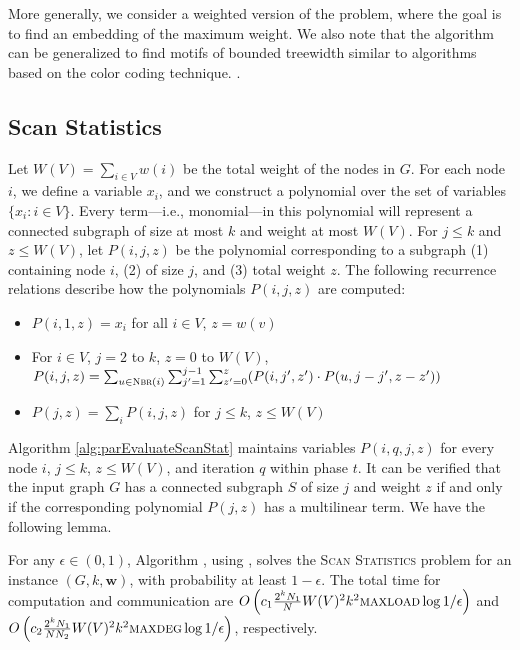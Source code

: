 More generally, we consider a weighted version of the problem, where the goal is to find an embedding of the maximum weight. We also note that the algorithm can be generalized to find motifs of bounded treewidth similar to algorithms based on the color coding technique. \cite{alon1995color}.
\fi 

\subsection{Scan Statistics}
\label{sec:apps-scanstat}
Let $W(V) = \sum_{i\in V}{w(i)}$ be the total weight of the nodes in $G$. For each node $i$, we define a variable $x_i$, and we construct a polynomial over the set of variables $\{x_i: i \in V\}$. Every term---i.e., monomial---in this polynomial will represent a connected subgraph of size at most $k$ and weight at most $W(V)$.
For $j \leq k$ and $z \leq W(V)$, let $P(i,j,z)$ be the polynomial corresponding to a subgraph (1) containing node $i$, (2) of size $j$, and (3) total weight $z$. The following recurrence relations describe how the polynomials $P(i, j, z)$ are computed:
\begin{itemize}
\item
$P(i, 1, z) = x_i$ for all $i \in V$, $z = w(v)$
\item
For $i \in V$, $j = 2$ to $k$, $z = 0$ to $W(V)$, 
$P(i,j, z) = \sum_{u \in \textsc{Nbr}(i)} \sum_{j' = 1}^{j-1}\sum_{z'=0}^z (P(i, j', z') \cdot P(u, j - j', z-z'))$
\item
$P(j, z) = \sum_i P(i,j, z)$ for $j \leq k$, $z \leq W(V)$
\end{itemize}
Algorithm \ref{alg:parEvaluateScanStat} maintains variables $P(i, q, j, z)$ for every node $i$, $j\leq k$, $z \leq W(V)$, and iteration $q$ within phase $t$. It can be verified \cite{cadena:bigdata17} that the input graph $G$ has a connected subgraph $S$ of size $j$ and weight $z$ if and only if the corresponding polynomial $P(j, z)$ has a multilinear term.
We have the following lemma.

\begin{lemma}
\label{lemma:parmaxwt-scan}
For any $\epsilon\in(0, 1)$,
Algorithm \ouralgo{}, using \parcircuitscan{}, solves the \textsc{Scan Statistics} problem for an
instance $(G, k, \mathbf{w})$, with probability at least $1-\epsilon$. The total time for
computation and communication are $O\left(c_1\frac{2^kN_1}{N}W(V)^2k^2 \textsc{maxload}{}\log{1/\epsilon}\right)$ 
and $O\left(c_2\frac{2^kN_1}{N N_2}W(V)^2k^2 \textsc{maxdeg}{}\log{1/\epsilon}\right)$, respectively.
\end{lemma}

